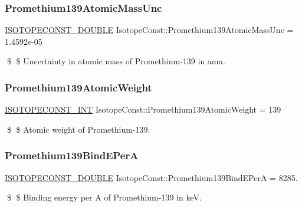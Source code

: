\subsubsection{\texorpdfstring{Promethium139\+Atomic\+Mass\+Unc}{Promethium139AtomicMassUnc}}
{\footnotesize\ttfamily \mbox{\hyperlink{group___isotope_const-_macros_ga8f45a7272ce02c0b4c65c44636ed719a}{I\+S\+O\+T\+O\+P\+E\+C\+O\+N\+S\+T\+\_\+\+D\+O\+U\+B\+LE}} Isotope\+Const\+::\+Promethium139\+Atomic\+Mass\+Unc = 1.\+4592e-\/05}

\$ \$ Uncertainty in atomic mass of Promethium-\/139 in amu. \mbox{\label{group___isotope_const-_promethium-_pm139_ga66a82081f8352ef61013e83b0e5660cb}} 
\subsubsection{\texorpdfstring{Promethium139\+Atomic\+Weight}{Promethium139AtomicWeight}}
{\footnotesize\ttfamily \mbox{\hyperlink{group___isotope_const-_macros_ga5f18360b3e99483a35c32d789e62621c}{I\+S\+O\+T\+O\+P\+E\+C\+O\+N\+S\+T\+\_\+\+I\+NT}} Isotope\+Const\+::\+Promethium139\+Atomic\+Weight = 139}

\$ \$ Atomic weight of Promethium-\/139. \mbox{\label{group___isotope_const-_promethium-_pm139_ga2595aae21247853d985347c5cdd3cc79}} 
\subsubsection{\texorpdfstring{Promethium139\+Bind\+E\+PerA}{Promethium139BindEPerA}}
{\footnotesize\ttfamily \mbox{\hyperlink{group___isotope_const-_macros_ga8f45a7272ce02c0b4c65c44636ed719a}{I\+S\+O\+T\+O\+P\+E\+C\+O\+N\+S\+T\+\_\+\+D\+O\+U\+B\+LE}} Isotope\+Const\+::\+Promethium139\+Bind\+E\+PerA = 8285.}

\$ \$ Binding energy per A of Promethium-\/139 in keV. \mbox{\label{group___isotope_const-_promethium-_pm139_gac2b703f69d2c5392a53198a84c87b35a}} 
